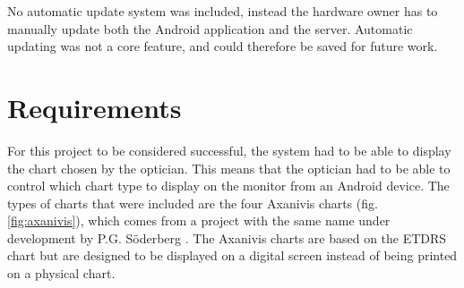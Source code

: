 \documentclass[12pt,a4paper,notitlepage]{report}
\begin{document}
No automatic update system was included, instead the hardware owner has to manually update both the Android application and the server. Automatic updating was not a core feature, and could therefore be saved for future work.

\section{Requirements}

For this project to be considered successful, the system had to be able to display the chart chosen by the optician. This means that the optician had to be able to control which chart type to display on the monitor from an Android device. The types of charts that were included are the four Axanivis charts (fig. \ref{fig:axanivis}), which comes from a project with the same name under development by P.G. Söderberg \cite{PGSoderbergOral}. The Axanivis charts are based on the ETDRS chart but are designed to be displayed on a digital screen instead of being printed on a physical chart. 
\end{document}
